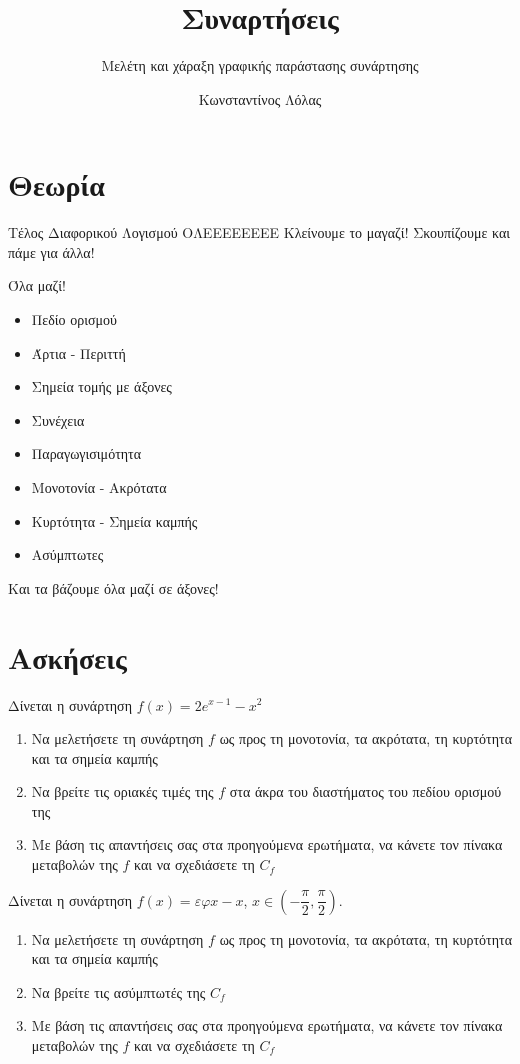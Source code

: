 \documentclass{presentation}
\title{Συναρτήσεις}
\subtitle{Μελέτη και χάραξη γραφικής παράστασης συνάρτησης}
\author[Λόλας]{Κωνσταντίνος Λόλας}
\begin{document}
\begin{frame}
  \titlepage
\end{frame}

\section{Θεωρία}

\begin{frame}{Τέλος Διαφορικού Λογισμού ΟΛΕΕΕΕΕΕΕΕ}
  Κλείνουμε το μαγαζί! Σκουπίζουμε και πάμε για άλλα!
\end{frame}

\begin{frame}{Όλα μαζί!}
  \begin{itemize}
    \item Πεδίο ορισμού
    \item Άρτια - Περιττή
    \item Σημεία τομής με άξονες
    \item Συνέχεια
    \item Παραγωγισιμότητα
    \item Μονοτονία - Ακρότατα
    \item Κυρτότητα - Σημεία καμπής
    \item Ασύμπτωτες
  \end{itemize}
  Και τα βάζουμε όλα μαζί σε άξονες!
\end{frame}

\section{Ασκήσεις}

\begin{askisi}
  Δίνεται η συνάρτηση $f(x)=2e^{x-1}-x^2$
  \begin{enumerate}[<+->]
    \item Να μελετήσετε τη συνάρτηση $f$ ως προς τη μονοτονία, τα ακρότατα, τη κυρτότητα και τα σημεία καμπής
    \item Να βρείτε τις οριακές τιμές της $f$ στα άκρα του διαστήματος του πεδίου ορισμού της
    \item Με βάση τις απαντήσεις σας στα προηγούμενα ερωτήματα, να κάνετε τον πίνακα μεταβολών της $f$ και να σχεδιάσετε τη $C_f$
  \end{enumerate}
\end{askisi}

\begin{askisi}
  Δίνεται η συνάρτηση $f(x)=εφx-x$, $x\in \left( -\dfrac{π}{2},\dfrac{π}{2} \right)$.
  \begin{enumerate}[<+->]
    \item Να μελετήσετε τη συνάρτηση $f$ ως προς τη μονοτονία, τα ακρότατα, τη κυρτότητα και τα σημεία καμπής
    \item Να βρείτε τις ασύμπτωτές της $C_f$
    \item Με βάση τις απαντήσεις σας στα προηγούμενα ερωτήματα, να κάνετε τον πίνακα μεταβολών της $f$ και να σχεδιάσετε τη $C_f$
  \end{enumerate}
\end{askisi}
\end{document}
